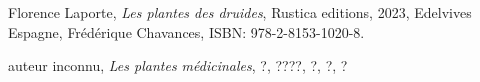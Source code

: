 
\renewcommand{\refname}{}
\begin{thebibliography}{9}

    Florence Laporte,
    \textit{Les plantes des druides},
    Rustica editions, 2023,
    Edelvives Espagne,
    Frédérique Chavances,
    ISBN: 978-2-8153-1020-8.

    auteur inconnu,
    \textit{Les plantes médicinales},
    ?, ????,
    ?,
    ?,
    ?
    
\end{thebibliography}